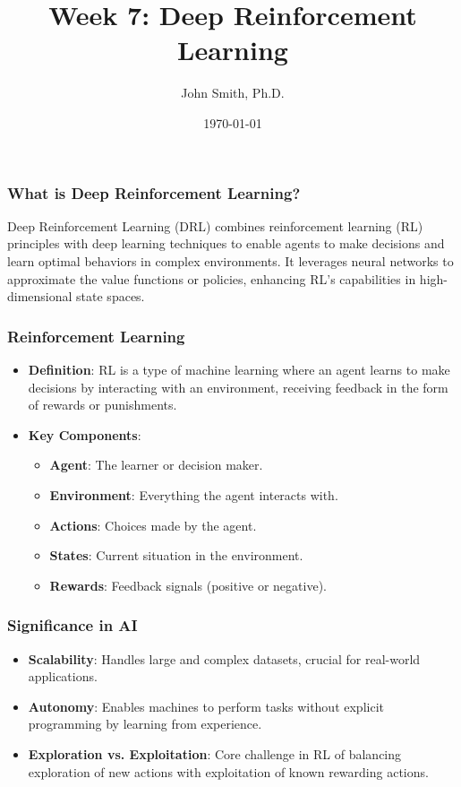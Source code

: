 \documentclass[aspectratio=169]{beamer}
\title[Deep Reinforcement Learning]{Week 7: Deep Reinforcement Learning}
\author[]{John Smith, Ph.D.}
\institute[University Name]{
  Department of Computer Science\\
  University Name\\
  \vspace{0.3cm}
  Email: email@university.edu\\
  Website: www.university.edu
}
\date{\today}
\begin{document}
\frame{\titlepage}

\begin{frame}[fragile]
    \titlepage
\end{frame}

\begin{frame}[fragile]
    \frametitle{What is Deep Reinforcement Learning?}
    Deep Reinforcement Learning (DRL) combines reinforcement learning (RL) principles with deep learning techniques to enable agents to make decisions and learn optimal behaviors in complex environments. It leverages neural networks to approximate the value functions or policies, enhancing RL's capabilities in high-dimensional state spaces.
\end{frame}

\begin{frame}[fragile]
    \frametitle{Reinforcement Learning}
    \begin{itemize}
        \item \textbf{Definition}: RL is a type of machine learning where an agent learns to make decisions by interacting with an environment, receiving feedback in the form of rewards or punishments.
        \item \textbf{Key Components}:
        \begin{itemize}
            \item \textbf{Agent}: The learner or decision maker.
            \item \textbf{Environment}: Everything the agent interacts with.
            \item \textbf{Actions}: Choices made by the agent.
            \item \textbf{States}: Current situation in the environment.
            \item \textbf{Rewards}: Feedback signals (positive or negative).
        \end{itemize}
    \end{itemize}
\end{frame}

\begin{frame}[fragile]
    \frametitle{Significance in AI}
    \begin{itemize}
        \item \textbf{Scalability}: Handles large and complex datasets, crucial for real-world applications.
        \item \textbf{Autonomy}: Enables machines to perform tasks without explicit programming by learning from experience.
        \item \textbf{Exploration vs. Exploitation}: Core challenge in RL of balancing exploration of new actions with exploitation of known rewarding actions.
    \end{itemize}
\end{frame}
\end{document}
